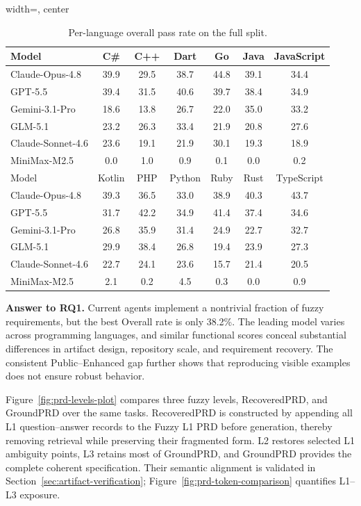 \begin{table}[t]
\centering
\caption{Per-language overall pass rate on the full \rcb{} split.}
\label{tab:language-results-full}
\small
\begin{adjustbox}{width=\linewidth, center}
\begin{tabular}{lcccccc}
\toprule
Model & C\# & C++ & Dart & Go & Java & JavaScript \\
\midrule
Claude-Opus-4.8 & 39.9 & 29.5 & 38.7 & 44.8 & 39.1 & 34.4 \\
GPT-5.5 & 39.4 & 31.5 & 40.6 & 39.7 & 38.4 & 34.9 \\
Gemini-3.1-Pro & 18.6 & 13.8 & 26.7 & 22.0 & 35.0 & 33.2 \\
GLM-5.1 & 23.2 & 26.3 & 33.4 & 21.9 & 20.8 & 27.6 \\
Claude-Sonnet-4.6 & 23.6 & 19.1 & 21.9 & 30.1 & 19.3 & 18.9 \\
MiniMax-M2.5 & 0.0 & 1.0 & 0.9 & 0.1 & 0.0 & 0.2 \\
\midrule
Model & Kotlin & PHP & Python & Ruby & Rust & TypeScript \\
\midrule
Claude-Opus-4.8 & 39.3 & 36.5 & 33.0 & 38.9 & 40.3 & 43.7 \\
GPT-5.5 & 31.7 & 42.2 & 34.9 & 41.4 & 37.4 & 34.6 \\
Gemini-3.1-Pro & 26.8 & 35.9 & 31.4 & 24.9 & 22.7 & 32.7 \\
GLM-5.1 & 29.9 & 38.4 & 26.8 & 19.4 & 23.9 & 27.3 \\
Claude-Sonnet-4.6 & 22.7 & 24.1 & 23.6 & 15.7 & 21.4 & 20.5 \\
MiniMax-M2.5 & 2.1 & 0.2 & 4.5 & 0.3 & 0.0 & 0.9 \\
\bottomrule
\end{tabular}
\end{adjustbox}
\end{table}

\textbf{Answer to RQ1.} Current agents implement a nontrivial fraction of fuzzy requirements, but the best Overall rate is only 38.2\%. The leading model varies across programming languages, and similar functional scores conceal substantial differences in artifact design, repository scale, and requirement recovery. The consistent Public--Enhanced gap further shows that reproducing visible examples does not ensure robust behavior.

Figure~\ref{fig:prd-levels-plot} compares three fuzzy levels, RecoveredPRD, and GroundPRD over the same tasks. RecoveredPRD is constructed by appending all L1 question--answer records to the Fuzzy L1 PRD before generation, thereby removing retrieval while preserving their fragmented form. L2 restores selected L1 ambiguity points, L3 retains most of GroundPRD, and GroundPRD provides the complete coherent specification. Their semantic alignment is validated in Section~\ref{sec:artifact-verification}; Figure~\ref{fig:prd-token-comparison} quantifies L1--L3 exposure.


